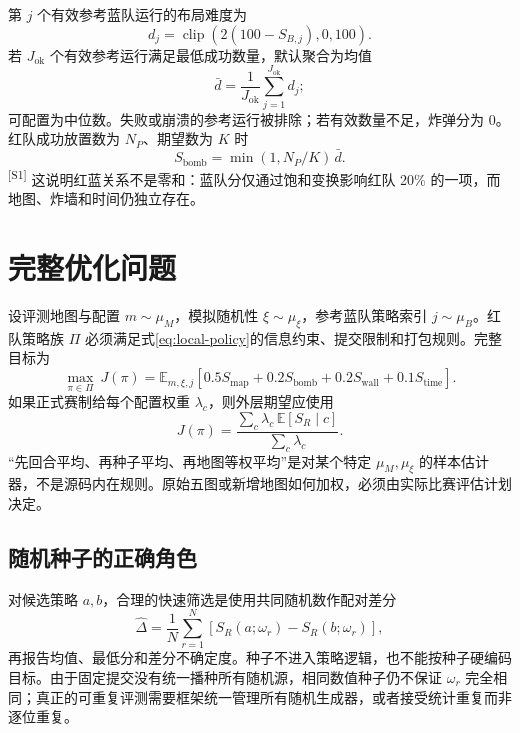 \documentclass[UTF8,11pt]{ctexart}
\newcommand{\src}[1]{\textsuperscript{\textcolor{blue!65!black}{[#1]}}}
\newcommand{\clip}{\operatorname{clip}}
\newcommand{\E}{\mathbb{E}}
\begin{document}
第 $j$ 个有效参考蓝队运行的布局难度为
\begin{equation}
d_j=\clip(2(100-S_{B,j}),0,100).
\end{equation}
若 $J_{\mathrm{ok}}$ 个有效参考运行满足最低成功数量，默认聚合为均值
\begin{equation}
\bar d=\frac1{J_{\mathrm{ok}}}\sum_{j=1}^{J_{\mathrm{ok}}}d_j;
\end{equation}
可配置为中位数。失败或崩溃的参考运行被排除；若有效数量不足，炸弹分为 0。红队成功放置数为 $N_P$、期望数为 $K$ 时
\begin{equation}
S_{\mathrm{bomb}}=\min(1,N_P/K)\,\bar d.
\label{eq:bomb-score}
\end{equation}
\src{S1} 这说明红蓝关系不是零和：蓝队分仅通过饱和变换影响红队 20\% 的一项，而地图、炸墙和时间仍独立存在。

\section{完整优化问题}

设评测地图与配置 $m\sim\mu_M$，模拟随机性 $\xi\sim\mu_\xi$，参考蓝队策略索引 $j\sim\mu_B$。红队策略族 $\Pi$ 必须满足式\eqref{eq:local-policy}的信息约束、提交限制和打包规则。完整目标为
\begin{equation}
\max_{\pi\in\Pi}\ J(\pi)
=\E_{m,\xi,j}\!\left[
0.5S_{\mathrm{map}}+0.2S_{\mathrm{bomb}}+0.2S_{\mathrm{wall}}+0.1S_{\mathrm{time}}
\right].
\label{eq:full-objective}
\end{equation}
如果正式赛制给每个配置权重 $\lambda_c$，则外层期望应使用
\begin{equation}
J(\pi)=\frac{\sum_c\lambda_c\,\E[S_R\mid c]}{\sum_c\lambda_c}.
\end{equation}
“先回合平均、再种子平均、再地图等权平均”是对某个特定 $\mu_M,\mu_\xi$ 的样本估计器，不是源码内在规则。原始五图或新增地图如何加权，必须由实际比赛评估计划决定。

\subsection{随机种子的正确角色}

对候选策略 $a,b$，合理的快速筛选是使用共同随机数作配对差分
\begin{equation}
\widehat\Delta=\frac1N\sum_{r=1}^{N}[S_R(a;\omega_r)-S_R(b;\omega_r)],
\end{equation}
再报告均值、最低分和差分不确定度。种子不进入策略逻辑，也不能按种子硬编码目标。由于固定提交没有统一播种所有随机源，相同数值种子仍不保证 $\omega_r$ 完全相同；真正的可重复评测需要框架统一管理所有随机生成器，或者接受统计重复而非逐位重复。
\end{document}
